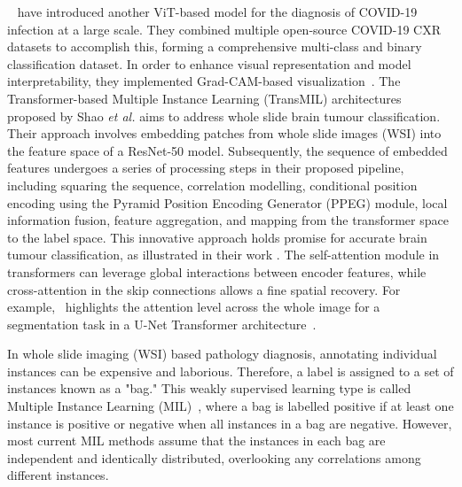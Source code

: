 \documentclass[dvipsnames]{article}
\renewcommand{\cite}[1]{\autocite{#1}}
\begin{document}
\citeauthor{shome2021covid}~\cite{shome2021covid} have introduced another ViT-based model for the diagnosis of COVID-19 infection at a large scale. They combined multiple open-source COVID-19 CXR datasets to accomplish this, forming a comprehensive multi-class and binary classification dataset. In order to enhance visual representation and model interpretability, they implemented Grad-CAM-based visualization~\cite{selvaraju2017grad}.
The Transformer-based Multiple Instance Learning (TransMIL) architectures proposed by Shao \textit{et al.} \cite{shao2021transmil} aims to address whole slide brain tumour classification. Their approach involves embedding patches from whole slide images (WSI) into the feature space of a ResNet-50 model. Subsequently, the sequence of embedded features undergoes a series of processing steps in their proposed pipeline, including squaring the sequence, correlation modelling, conditional position encoding using the Pyramid Position Encoding Generator (PPEG) module, local information fusion, feature aggregation, and mapping from the transformer space to the label space. This innovative approach holds promise for accurate brain tumour classification, as illustrated in their work \cite{shao2021transmil}.
The self-attention module in transformers can leverage global interactions between encoder features, while cross-attention in the skip connections allows a fine spatial recovery.
For example,~ highlights the attention level across the whole image for a segmentation task in a U-Net Transformer architecture~\cite{petit2021u,huang2022swin}.



In whole slide imaging (WSI) based pathology diagnosis, annotating individual instances can be expensive and laborious. Therefore, a label is assigned to a set of instances known as a "bag." This weakly supervised learning type is called Multiple Instance Learning (MIL)~\cite{fung2007multiple}, where a bag is labelled positive if at least one instance is positive or negative when all instances in a bag are negative. However, most current MIL methods assume that the instances in each bag are independent and identically distributed, overlooking any correlations among different instances.
\end{document}
